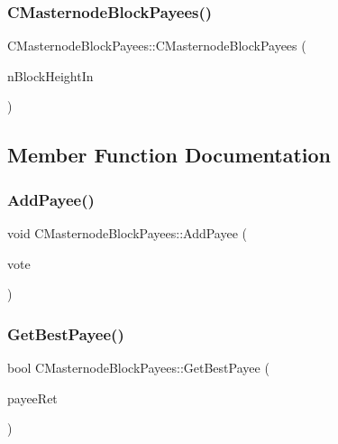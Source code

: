 \subsubsection{\texorpdfstring{C\+Masternode\+Block\+Payees()}{CMasternodeBlockPayees()}\hspace{0.1cm}{\footnotesize\ttfamily [2/2]}}
{\footnotesize\ttfamily C\+Masternode\+Block\+Payees\+::\+C\+Masternode\+Block\+Payees (\begin{DoxyParamCaption}\item[{int}]{n\+Block\+Height\+In }\end{DoxyParamCaption})\hspace{0.3cm}{\ttfamily [inline]}}



\subsection{Member Function Documentation}
\mbox{\label{class_c_masternode_block_payees_abce1347dcf4dc53a329f2dc338a77dc3}} 
\subsubsection{\texorpdfstring{Add\+Payee()}{AddPayee()}}
{\footnotesize\ttfamily void C\+Masternode\+Block\+Payees\+::\+Add\+Payee (\begin{DoxyParamCaption}\item[{const \mbox{\hyperlink{class_c_masternode_payment_vote}{C\+Masternode\+Payment\+Vote}} \&}]{vote }\end{DoxyParamCaption})}

\mbox{\label{class_c_masternode_block_payees_a1b7d7842fa0102e17aaf4637b5815d04}} 
\subsubsection{\texorpdfstring{Get\+Best\+Payee()}{GetBestPayee()}}
{\footnotesize\ttfamily bool C\+Masternode\+Block\+Payees\+::\+Get\+Best\+Payee (\begin{DoxyParamCaption}\item[{C\+Script \&}]{payee\+Ret }\end{DoxyParamCaption})}

